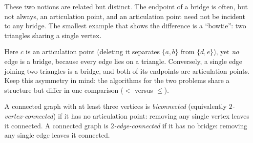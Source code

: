 These two notions are related but distinct. The endpoint of a bridge is often,
but not always, an articulation point, and an articulation point need not be incident
to any bridge. The smallest example that shows the difference is a ``bowtie'': two triangles
sharing a single vertex.

\begin{center}
\end{center}

Here $c$ is an articulation point (deleting it separates $\{a,b\}$ from $\{d,e\}$), yet
\emph{no} edge is a bridge, because every edge lies on a triangle. Conversely, a single
edge joining two triangles is a bridge, and both of its endpoints are articulation
points. Keep this asymmetry in mind: the algorithms for the two problems share a
structure but differ in one comparison ($<$ versus $\le$).

\begin{definition}
\label{ch10:def-biconn}
A connected graph with at least three vertices is \emph{biconnected} (equivalently
\emph{$2$-vertex-connected}) if it has no articulation point: removing any single
vertex leaves it connected. A connected graph is \emph{$2$-edge-connected} if it has
no bridge: removing any single edge leaves it connected.
\end{definition}

